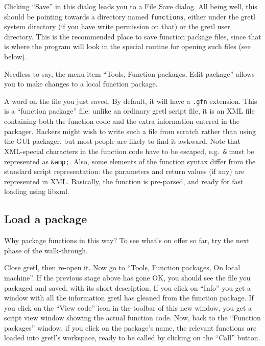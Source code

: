 Clicking ``Save'' in this dialog leads you to a File Save dialog.  All
being well, this should be pointing towards a directory named
\texttt{functions}, either under the gretl system directory (if
you have write permission on that) or the gretl user directory.
This is the recommended place to save function package files, since
that is where the program will look in the special routine for opening
such files (see below).

Needless to say, the menu item ``Tools, Function packages, Edit
package'' allows you to make changes to a local function package.

\vspace{6pt}

A word on the file you just saved.  By default, it will have a
\texttt{.gfn} extension.  This is a ``function package'' file: unlike
an ordinary gretl script file, it is an XML file containing both
the function code and the extra information entered in the packager.
Hackers might wish to write such a file from scratch rather than using
the GUI packager, but most people are likely to find it awkward.  Note
that XML-special characters in the function code have to be escaped,
e.g.\ \texttt{\&} must be represented as \texttt{\&amp;}.  Also, some
elements of the function syntax differ from the standard script
representation: the parameters and return values (if any) are
represented in XML.  Basically, the function is pre-parsed, and ready
for fast loading using \textsf{libxml}.

\vspace{6pt}

\subsection{Load a package}

Why package functions in this way?  To see what's on offer so far, try
the next phase of the walk-through.

Close gretl, then re-open it.  Now go to ``Tools, Function packages,
On local machine''. If the previous stage above has gone OK, you
should see the file you packaged and saved, with its short
description.  If you click on ``Info'' you get a window with all the
information gretl has gleaned from the function package.  If you click
on the ``View code'' icon in the toolbar of this new window, you get a
script view window showing the actual function code. Now, back to the
``Function packages'' window, if you click on the package's name, the
relevant functions are loaded into gretl's workspace, ready to be
called by clicking on the ``Call'' button.


